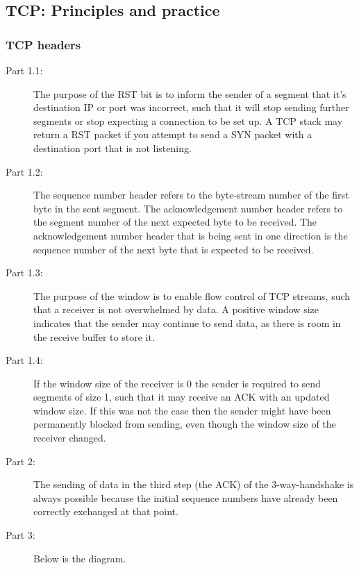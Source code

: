 \subsection{TCP: Principles and practice}
\subsubsection{TCP headers}
\begin{description}
    \item[Part 1.1:] The purpose of the RST bit is to inform the sender of a segment that it's destination IP or port was
        incorrect, such that it will stop sending further segments or stop expecting a connection to be set up. A TCP stack
        may return a RST packet if you attempt to send a SYN packet with a destination port that is not listening.
    \item[Part 1.2:] The sequence number header refers to the byte-stream number of the first byte in the sent segment. The
        acknowledgement number header refers to the segment number of the next expected byte to be received. The acknowledgement
        number header that is being sent in one direction is the sequence number of the next byte that is expected to be received.
    \item[Part 1.3:] The purpose of the window is to enable flow control of TCP streams, such that a receiver is not overwhelmed
        by data. A positive window size indicates that the sender may continue to send data, as there is room in the receive buffer
        to store it.
    \item[Part 1.4:] If the window size of the receiver is 0 the sender is required to send segments of size 1, such
        that it may receive an ACK with an updated window size. If this was not the case then the sender might have been
        permanently blocked from sending, even though the window size of the receiver changed.
    \item[Part 2:] The sending of data in the third step (the ACK) of the 3-way-handshake is always possible because the initial
        sequence numbers have already been correctly exchanged at that point.
    \item[Part 3:] Below is the diagram.
        \begin{figure}[!h]
        \centering

\end{figure}
\end{description}
